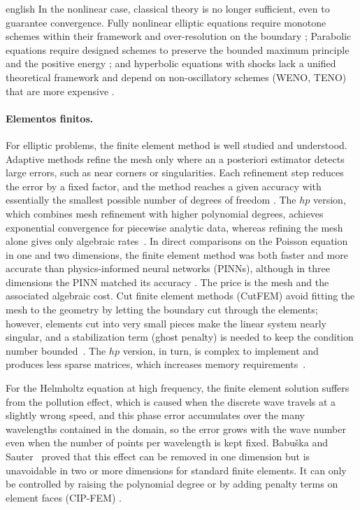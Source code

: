 \documentclass[0000.tex]{subfiles}
\begin{document}
\begin{hyphenrules}{english}
In the nonlinear case, classical theory is no longer sufficient, even to guarantee convergence. Fully nonlinear elliptic equations require monotone schemes within their 
framework and over-resolution on the boundary \cite{hamfeldt2022convergent,neilan2019monge,del2022finite}; Parabolic equations require designed schemes to preserve the 
bounded maximum principle and the positive energy \cite{hou2023linear,qin2026second,del2023finite}; and hyperbolic equations with shocks lack a unified theoretical 
framework and depend on non-oscillatory schemes (WENO, TENO) that are more expensive \cite{tadmor2012review,fu2023review}.

\paragraph{Elementos finitos.}

For elliptic problems, the finite element method is well studied and understood. Adaptive methods refine the mesh only where an a posteriori estimator detects 
large errors, such as near corners or singularities. Each refinement step reduces the error by a fixed factor, and the method reaches a given accuracy with 
essentially the smallest possible number of degrees of freedom \cite{bonito2024adaptive}. The $hp$ version, which combines mesh refinement with higher polynomial degrees, 
achieves exponential convergence for piecewise analytic data, whereas refining the mesh alone gives only algebraic rates~\cite{babuvska1994p}. In direct 
comparisons on the Poisson equation in one and two dimensions, the finite element method was both faster and more accurate than physics-informed neural networks 
(PINNs), although in three dimensions the PINN matched its accuracy \cite{grossmann2024can}. The price is the mesh and the associated algebraic cost. Cut finite element methods (CutFEM) avoid fitting the mesh to the geometry by letting the boundary
cut through the elements; however, elements cut into very small pieces make the linear system nearly singular, and a stabilization term (ghost penalty) is
needed to keep the condition number bounded~\cite{burman2025cut}. The $hp$ version, in turn, is complex to implement and produces less sparse matrices,
which increases memory requirements~\cite{babuvska1994p}.

For the Helmholtz equation at high frequency, the finite element solution suffers from the pollution effect, which is caused when the discrete wave travels at a 
slightly wrong speed, and this phase error accumulates over the many wavelengths contained in the domain, so the error grows with the wave number even when the number 
of points per wavelength is kept fixed. Babu\v{s}ka and Sauter~\cite{babuska1997pollution} proved that this effect can be removed in one dimension but is 
unavoidable in two or more dimensions for standard finite elements. It can only be controlled by raising the polynomial degree or by adding penalty terms on 
element faces (CIP-FEM) \cite{li2019fem,galkowski2026numerical}.


\end{hyphenrules}
\end{document}
